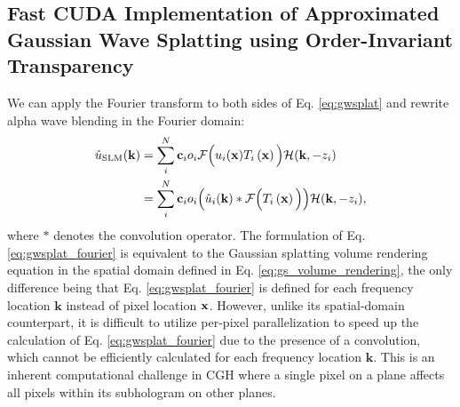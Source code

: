 



\subsection{Fast CUDA Implementation of Approximated Gaussian Wave Splatting using Order-Invariant Transparency}
\label{subsec:fast-alpha-wave-blending}

We can apply the Fourier transform to both sides of Eq. \ref{eq:gwsplat} and rewrite alpha wave blending in the Fourier domain:
%
\begin{align}
    \hat{u}_{\textrm{SLM}} (\mathbf{k}) 
    & = \sum_{i}^N \mathbf{c}_i o_i\mathcal{F}\Big(  u_i(\mathbf{x})T_i\left(\mathbf{x}\right)\Big)\mathcal{H}(\mathbf{k}, -z_i) \notag \\
    & = \sum_{i}^N \mathbf{c}_i o_i \Big(  \hat{u}_i(\mathbf{k})\ast \mathcal{F}\Big(T_i\left(\mathbf{x}\right)\Big)\Big)\mathcal{H}(\mathbf{k}, -z_i),     
    \label{eq:gwsplat_fourier}
\end{align} 
where $\ast$ denotes the convolution operator. The formulation of Eq. \ref{eq:gwsplat_fourier} is equivalent to the Gaussian splatting volume rendering equation in the spatial domain defined in Eq. \ref{eq:gs_volume_rendering}, the only difference being that Eq. \ref{eq:gwsplat_fourier} is defined for each frequency location $\mathbf{k}$ instead of pixel location $\mathbf{x}$. However, unlike its spatial-domain counterpart, it is difficult to  utilize per-pixel parallelization to speed up the calculation of Eq. \ref{eq:gwsplat_fourier} due to the presence of a convolution, which cannot be efficiently calculated for each frequency location $\mathbf{k}$. This is an inherent computational challenge in CGH where a single pixel on a plane affects all pixels within its subhologram on other planes.

